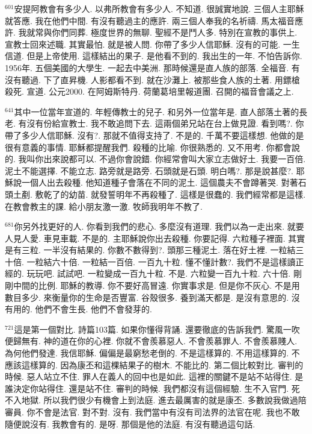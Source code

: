 \documentclass{book}
\begin{document}
$^{601}$安提阿教會有多少人.
以弗所教會有多少人.
不知道.
很誠實地說.
三個人主耶穌就答應.
我在他們中間.
有沒有聽過主的應許.
兩三個人奉我的名祈禱.
馬太福音應許.
我就常與你們同葬.
極度世界的無聊.
聖經不是鬥人多.
特別在宣教的事供上.
宣教士回來述職.
其實最怕.
就是被人問.
你帶了多少人信耶穌.
沒有的可能.
一生信道.
但是上帝使用.
這樣結出的果子.
是他看不到的.
我出生的一年.
不怕告訴你.
1956年.
五個美國的大學生.
一起去中美洲.
那時候還是直人族的部落.
全福音.
有沒有聽過.
下了直昇機.
人影都看不到.
就在沙灘上.
被那些食人族的土著.
用鏢槍殺死.
宣道.
公元2000.
在阿姆斯特丹.
荷蘭葛培里報道團.
召開的福音會議之上.

$^{641}$其中一位當年宣道的.
年輕傳教士的兒子.
和另外一位當年是.
直人部落土著的長老.
有沒有份給宣教士.
我不敢追問下去.
這兩個弟兄站在台上做見證.
看到嗎?.
你帶了多少人信耶穌.
沒有?.
那就不值得支持了.
不是的.
千萬不要這樣想.
他做的是很有意義的事情.
耶穌都提醒我們.
殺種的比喻.
你很熟悉的.
又不用考.
你都會說的.
我叫你出來說都可以.
不過你會說錯.
你經常會叫大家立志做好土.
我要一百倍.
泥土不能選擇.
不能立志.
路旁就是路旁.
石頭就是石頭.
明白嗎?.
那是說甚麼?.
耶穌說一個人出去殺種.
他知道種子會落在不同的泥土.
這個農夫不會蹲著哭.
對著石頭土剷.
敷乾了的幼苗.
就發誓明年不再殺種了.
這樣是很蠢的.
我們經常都是這樣.
在教會教主的課.
給小朋友激一激.
牧師我明年不教了.

$^{681}$你另外找更好的人.
你看到我們的悲心.
多麼沒有道理.
我們以為一走出來.
就要人見人愛.
車見車載.
不是的.
主耶穌說你出去殺種.
你要記得.
六粒種子裡面.
其實是有三粒.
一半沒有結果的.
你數不數得到?.
頭那三種泥土.
落在好土裡.
一粒結三十倍.
一粒結六十倍.
一粒結一百倍.
一百九十粒.
懂不懂計數?.
我們不是這樣讀正經的.
玩玩吧.
試試吧.
一粒變成一百九十粒.
不是.
六粒變一百九十粒.
六十倍.
剛剛中間的比例.
耶穌的教導.
你不要好高冒遠.
你實事求是.
但是你不灰心.
不是用數目多少.
來衡量你的生命是否豐富.
谷殼很多.
養到滿天都是.
是沒有意思的.
沒有用的.
他們不會生長.
他們不會發芽的.

$^{721}$這是第一個對比.
詩篇103篇.
如果你懂得背誦.
還要徹底的告訴我們.
驚風一吹便歸無有.
神的道在你的心裡.
你就不會羨慕惡人.
不會羨慕罪人.
不會羨慕賤人.
為何他們發達.
我信耶穌.
偏偏是最窮愁老倒的.
不是這樣算的.
不用這樣算的.
不應該這樣算的.
因為康丕和這棵結果子的樹木.
不能比的.
第二個比較對比.
審判的時候.
惡人站立不住.
罪人在義人的回中也是如此.
這裡的關鍵不是站不站得住.
是誰決定你站得住.
還是站不住.
審判的時候.
我們都沒有這個經驗.
生不入官門.
死不入地獄.
所以我們很少有機會上到法庭.
進去最厲害的就是康丕.
多數說我做過陪審員.
你不會是法官.
對不對.
沒有.
我們當中有沒有司法界的法官在呢.
我也不敢隨便說沒有.
我教會有的.
是呀.
那個是他的法庭.
有沒有聽過這句話.
\end{document}
